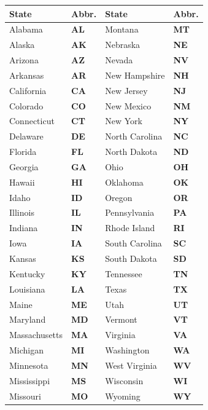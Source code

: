 \documentclass[11pt,letterpaper]{article}
\begin{document}
{\fontsize{10}{12.1}\selectfont
{}
\begin{tabularx}{\linewidth}{|Y{1.62}|Y{0.38}|Y{1.62}|Y{0.38}|}
\hline
{}
\textbf{State} & \textbf{Abbr.} & \textbf{State} & \textbf{Abbr.} \\ \hline
Alabama & \textbf{AL} & Montana & \textbf{MT} \\ \hline
Alaska & \textbf{AK} & Nebraska & \textbf{NE} \\ \hline
Arizona & \textbf{AZ} & Nevada & \textbf{NV} \\ \hline
Arkansas & \textbf{AR} & New Hampshire & \textbf{NH} \\ \hline
California & \textbf{CA} & New Jersey & \textbf{NJ} \\ \hline
Colorado & \textbf{CO} & New Mexico & \textbf{NM} \\ \hline
Connecticut & \textbf{CT} & New York & \textbf{NY} \\ \hline
Delaware & \textbf{DE} & North Carolina & \textbf{NC} \\ \hline
Florida & \textbf{FL} & North Dakota & \textbf{ND} \\ \hline
Georgia & \textbf{GA} & Ohio & \textbf{OH} \\ \hline
Hawaii & \textbf{HI} & Oklahoma & \textbf{OK} \\ \hline
Idaho & \textbf{ID} & Oregon & \textbf{OR} \\ \hline
Illinois & \textbf{IL} & Pennsylvania & \textbf{PA} \\ \hline
Indiana & \textbf{IN} & Rhode Island & \textbf{RI} \\ \hline
Iowa & \textbf{IA} & South Carolina & \textbf{SC} \\ \hline
Kansas & \textbf{KS} & South Dakota & \textbf{SD} \\ \hline
Kentucky & \textbf{KY} & Tennessee & \textbf{TN} \\ \hline
Louisiana & \textbf{LA} & Texas & \textbf{TX} \\ \hline
Maine & \textbf{ME} & Utah & \textbf{UT} \\ \hline
Maryland & \textbf{MD} & Vermont & \textbf{VT} \\ \hline
Massachusetts & \textbf{MA} & Virginia & \textbf{VA} \\ \hline
Michigan & \textbf{MI} & Washington & \textbf{WA} \\ \hline
Minnesota & \textbf{MN} & West Virginia & \textbf{WV} \\ \hline
Mississippi & \textbf{MS} & Wisconsin & \textbf{WI} \\ \hline
Missouri & \textbf{MO} & Wyoming & \textbf{WY} \\ \hline
\end{tabularx}
}\par
\end{document}
